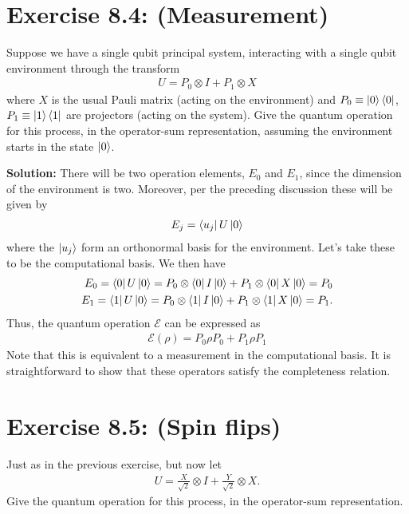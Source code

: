 \documentclass{book}
\newcommand{\mc}[1]{\mathcal{#1}}
\begin{document}
\section*{Exercise 8.4: (Measurement)}
    Suppose we have a single qubit principal system, interacting with a single qubit environment through the transform
    \begin{align}
        U = P_0\otimes I + P_1 \otimes X
    \end{align}
    where $X$ is the usual Pauli matrix (acting on the environment) and $P_0\equiv \ket{0}\bra{0}$, $P_1 \equiv \ket{1}\bra{1}$ are projectors (acting on the system). Give the quantum operation for this process, in the operator-sum representation, assuming the environment starts in the state $\ket{0}$.
    
    \textbf{Solution:} There will be two operation elements, $E_0$ and $E_1$, since the dimension of the environment is two. Moreover, per the preceding discussion these will be given by
    \begin{align}
        E_j = \bra{u_j}U\ket{0}
    \end{align}
    where the $\ket{u_j}$ form an orthonormal basis for the environment. Let's take these to be the computational basis. We then have
    \begin{align}
    \begin{aligned}
        E_0 = \bra{0}U\ket{0} = P_0\otimes \bra{0}I\ket{0} + P_1 \otimes \bra{0}X\ket{0} = P_0 \\
        E_1 = \bra{1}U\ket{0} = P_0\otimes \bra{1}I\ket{0} + P_1 \otimes \bra{1}X\ket{0} = P_1.
    \end{aligned}
    \end{align}
    Thus, the quantum operation $\mc{E}$ can be expressed as
    \begin{align}
        \mc{E}(\rho) = P_0 \rho P_0 + P_1 \rho P_1
    \end{align}
    Note that this is equivalent to a measurement in the computational basis. It is straightforward to show that these operators satisfy the completeness relation. 

\section*{Exercise 8.5: (Spin flips)}
    Just as in the previous exercise, but now let 
    \begin{align}
        U = \frac{X}{\sqrt{2}}\otimes I + \frac{Y}{\sqrt{2}}\otimes X.
    \end{align}
    Give the quantum operation for this process, in the operator-sum representation.
    
\end{document}
